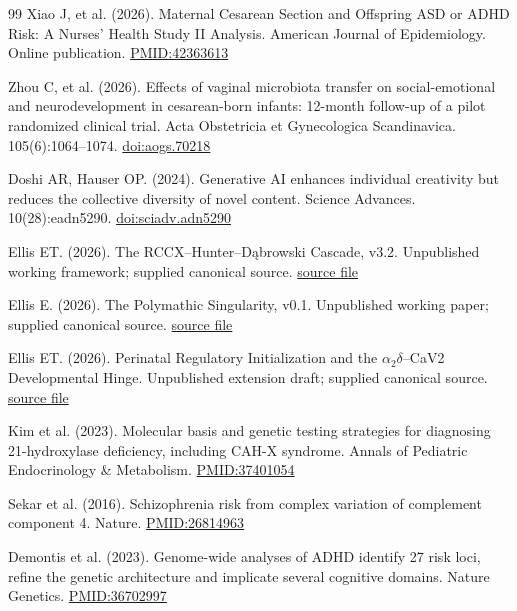 \begin{thebibliography}{99}
 Xiao J, et al. (2026). Maternal Cesarean Section and Offspring ASD or ADHD Risk: A Nurses’ Health Study II Analysis. American Journal of Epidemiology. Online publication. \href{https://pubmed.ncbi.nlm.nih.gov/42363613/}{PMID:42363613}

 Zhou C, et al. (2026). Effects of vaginal microbiota transfer on social-emotional and neurodevelopment in cesarean-born infants: 12-month follow-up of a pilot randomized clinical trial. Acta Obstetricia et Gynecologica Scandinavica. 105(6):1064–1074. \href{https://doi.org/10.1111/aogs.70218}{doi:aogs.70218}

 Doshi AR, Hauser OP. (2024). Generative AI enhances individual creativity but reduces the collective diversity of novel content. Science Advances. 10(28):eadn5290. \href{https://doi.org/10.1126/sciadv.adn5290}{doi:sciadv.adn5290}

 Ellis ET. (2026). The RCCX–Hunter–Dąbrowski Cascade, v3.2. Unpublished working framework; supplied canonical source. \href{https://github.com/ETEllis/DRC/blob/main/papers/rccx-hunter-dabrowski-v3.2.pdf}{source file}

 Ellis E. (2026). The Polymathic Singularity, v0.1. Unpublished working paper; supplied canonical source. \href{https://github.com/ETEllis/DRC/blob/main/papers/polymathic-singularity-v0.1.pdf}{source file}

 Ellis ET. (2026). Perinatal Regulatory Initialization and the \ensuremath{\alpha_2\delta}–CaV2 Developmental Hinge. Unpublished extension draft; supplied canonical source. \href{https://github.com/ETEllis/DRC/blob/main/papers/perinatal-extension-source.md}{source file}

 Kim et al. (2023). Molecular basis and genetic testing strategies for diagnosing 21-hydroxylase deficiency, including CAH-X syndrome. Annals of Pediatric Endocrinology \& Metabolism. \href{https://pubmed.ncbi.nlm.nih.gov/37401054/}{PMID:37401054}

 Sekar et al. (2016). Schizophrenia risk from complex variation of complement component 4. Nature. \href{https://pubmed.ncbi.nlm.nih.gov/26814963/}{PMID:26814963}

 Demontis et al. (2023). Genome-wide analyses of ADHD identify 27 risk loci, refine the genetic architecture and implicate several cognitive domains. Nature Genetics. \href{https://pubmed.ncbi.nlm.nih.gov/36702997/}{PMID:36702997}


\end{thebibliography}
